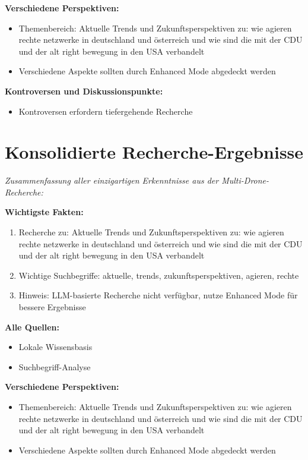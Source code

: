 \documentclass[12pt,a4paper]{article}
\begin{document}
\textbf{Verschiedene Perspektiven:}
\begin{itemize}
\item Themenbereich: Aktuelle Trends und Zukunftsperspektiven zu: wie agieren rechte netzwerke in deutschland und österreich und wie sind die mit der CDU und der alt right bewegung in den USA verbandelt
\item Verschiedene Aspekte sollten durch Enhanced Mode abgedeckt werden
\end{itemize}

\textbf{Kontroversen und Diskussionspunkte:}
\begin{itemize}
\item Kontroversen erfordern tiefergehende Recherche
\end{itemize}

\newpage
\section{Konsolidierte Recherche-Ergebnisse}

\textit{Zusammenfassung aller einzigartigen Erkenntnisse aus der Multi-Drone-Recherche:}

\textbf{Wichtigste Fakten:}
\begin{enumerate}
\item Recherche zu: Aktuelle Trends und Zukunftsperspektiven zu: wie agieren rechte netzwerke in deutschland und österreich und wie sind die mit der CDU und der alt right bewegung in den USA verbandelt
\item Wichtige Suchbegriffe: aktuelle, trends, zukunftsperspektiven, agieren, rechte
\item Hinweis: LLM-basierte Recherche nicht verfügbar, nutze Enhanced Mode für bessere Ergebnisse
\end{enumerate}

\textbf{Alle Quellen:}
\begin{itemize}
\item Lokale Wissensbasis
\item Suchbegriff-Analyse
\end{itemize}

\textbf{Verschiedene Perspektiven:}
\begin{itemize}
\item Themenbereich: Aktuelle Trends und Zukunftsperspektiven zu: wie agieren rechte netzwerke in deutschland und österreich und wie sind die mit der CDU und der alt right bewegung in den USA verbandelt
\item Verschiedene Aspekte sollten durch Enhanced Mode abgedeckt werden
\end{itemize}
\end{document}
